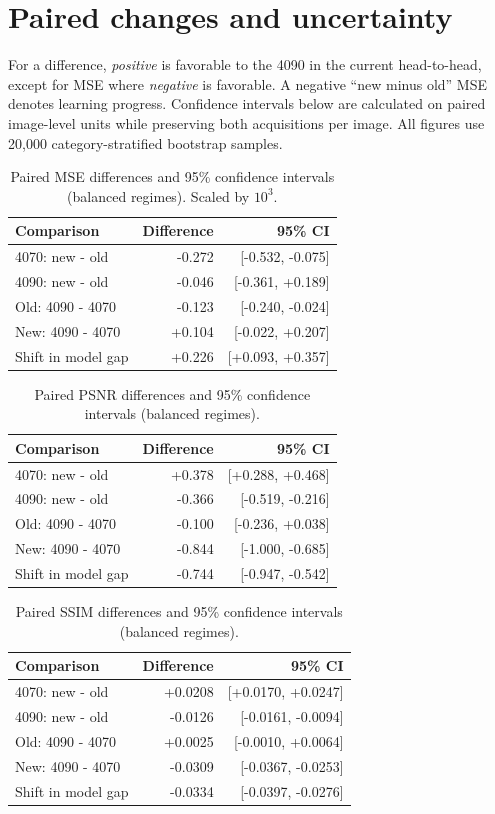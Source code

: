 \documentclass[11pt,a4paper]{article}
\begin{document}
\section{Paired changes and uncertainty}
For a difference, \emph{positive} is favorable to the 4090 in the current head-to-head, except for MSE where \emph{negative} is favorable. A negative ``new minus old'' MSE denotes learning progress. Confidence intervals below are calculated on paired image-level units while preserving both acquisitions per image. All figures use 20,000 category-stratified bootstrap samples.
\begin{table}[ht]\centering\small
\caption{Paired MSE differences and 95\% confidence intervals (balanced regimes). Scaled by $10^{3}$.}
\begin{tabular}{lrr}\toprule Comparison & Difference & 95\% CI \\ \midrule
4070: new - old & -0.272 & [-0.532, -0.075] \\
4090: new - old & -0.046 & [-0.361, +0.189] \\
Old: 4090 - 4070 & -0.123 & [-0.240, -0.024] \\
New: 4090 - 4070 & +0.104 & [-0.022, +0.207] \\
Shift in model gap & +0.226 & [+0.093, +0.357] \\
\bottomrule\end{tabular}\end{table}
\begin{table}[ht]\centering\small
\caption{Paired PSNR differences and 95\% confidence intervals (balanced regimes). }
\begin{tabular}{lrr}\toprule Comparison & Difference & 95\% CI \\ \midrule
4070: new - old & +0.378 & [+0.288, +0.468] \\
4090: new - old & -0.366 & [-0.519, -0.216] \\
Old: 4090 - 4070 & -0.100 & [-0.236, +0.038] \\
New: 4090 - 4070 & -0.844 & [-1.000, -0.685] \\
Shift in model gap & -0.744 & [-0.947, -0.542] \\
\bottomrule\end{tabular}\end{table}
\clearpage
\begin{table}[ht]\centering\small
\caption{Paired SSIM differences and 95\% confidence intervals (balanced regimes). }
\begin{tabular}{lrr}\toprule Comparison & Difference & 95\% CI \\ \midrule
4070: new - old & +0.0208 & [+0.0170, +0.0247] \\
4090: new - old & -0.0126 & [-0.0161, -0.0094] \\
Old: 4090 - 4070 & +0.0025 & [-0.0010, +0.0064] \\
New: 4090 - 4070 & -0.0309 & [-0.0367, -0.0253] \\
Shift in model gap & -0.0334 & [-0.0397, -0.0276] \\
\bottomrule\end{tabular}\end{table}
\end{document}
